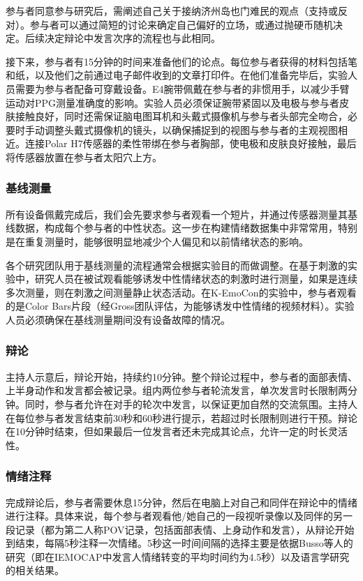 参与者同意参与研究后，需阐述自己关于接纳济州岛也门难民的观点（支持或反对）。参与者可以通过简短的讨论来确定自己偏好的立场，或通过抛硬币随机决定。后续决定辩论中发言次序的流程也与此相同。

接下来，参与者有15分钟的时间来准备他们的论点。每位参与者获得的材料包括笔和纸，以及他们之前通过电子邮件收到的文章打印件。在他们准备完毕后，实验人员需要为参与者配备可穿戴设备。E4腕带佩戴在参与者的非惯用手，以减少手臂运动对PPG测量准确度的影响。实验人员必须保证腕带紧固以及电极与参与者皮肤接触良好，同时还需保证脑电图耳机和头戴式摄像机与参与者头部完全吻合，必要时手动调整头戴式摄像机的镜头，以确保捕捉到的视图与参与者的主观视图相近。连接Polar H7传感器的柔性带绑在参与者胸部，使电极和皮肤良好接触，最后将传感器放置在参与者太阳穴上方。

\subsubsection{基线测量}
所有设备佩戴完成后，我们会先要求参与者观看一个短片，并通过传感器测量其基线数据，构成每个参与者的中性状态。这一步在构建情绪数据集中非常常用，特别是在重复测量时，能够很明显地减少个人偏见和以前情绪状态的影响。

各个研究团队用于基线测量的流程通常会根据实验目的而做调整。在基于刺激的实验中，研究人员在被试观看能够诱发中性情绪状态的刺激时进行测量，如果是连续多次测量，则在刺激之间测量静止状态活动。在K-EmoCon的实验中，参与者观看的是Color Bars片段（经Gross团队评估，为能够诱发中性情绪的视频材料）。实验人员必须确保在基线测量期间没有设备故障的情况。

\subsubsection{辩论}
主持人示意后，辩论开始，持续约10分钟。整个辩论过程中，参与者的面部表情、上半身动作和发言都会被记录。组内两位参与者轮流发言，单次发言时长限制两分钟。同时，参与者允许在对手的轮次中发言，以保证更加自然的交流氛围。主持人在每位参与者发言结束前30秒和60秒进行提示，若超过时长限制则进行干预。辩论在10分钟时结束，但如果最后一位发言者还未完成其论点，允许一定的时长灵活性。

\subsubsection{情绪注释}
完成辩论后，参与者需要休息15分钟，然后在电脑上对自己和同伴在辩论中的情绪进行注释。具体来说，每个参与者观看他/她自己的一段视听录像以及同伴的另一段记录（都为第二人称POV记录，包括面部表情、上身动作和发言），从辩论开始到结束，每隔5秒注释一次情绪。5秒这一时间间隔的选择主要是依据Busso等人的研究（即在IEMOCAP中发言人情绪转变的平均时间约为4.5秒）以及语言学研究的相关结果。

